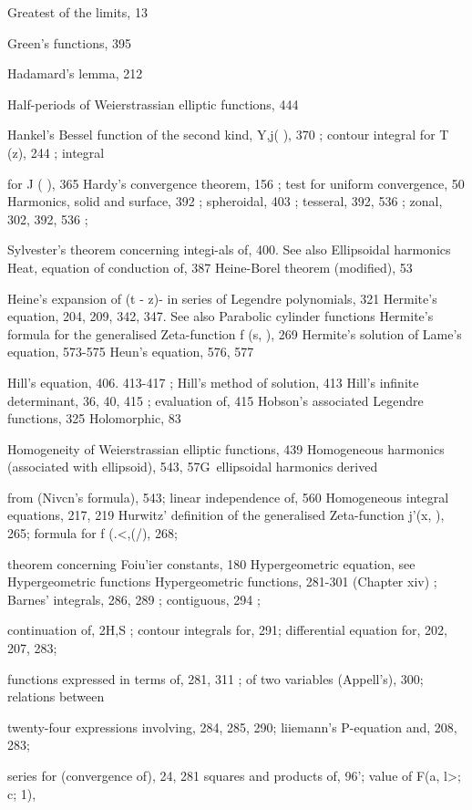 Greatest of the limits, 13

Green's functions, 395

Hadamard's lemma, 212

Half-periods of Weierstrassian elliptic functions, 444

Hankel's Bessel function of the second kind, Y,j( ), 370 ; contour integral for T (z), 244 ; integral

for J ( ), 365
Hardy's convergence theorem, 156 ; test for uniform convergence, 50
Harmonics, solid and surface, 392 ; spheroidal, 403 ; tesseral, 392, 536 ; zonal, 302, 392, 536 ;

Sylvester's theorem concerning integi-als of, 400. See also Ellipsoidal harmonics
Heat, equation of conduction of, 387
Heine-Borel theorem (modified), 53

Heine's expansion of (t - z)-  in series of Legendre polynomials, 321
Hermite's equation, 204, 209, 342, 347. See also Parabolic cylinder functions
Hermite's formula for the generalised Zeta-function f (s,  ), 269
Hermite's solution of Lame's equation, 573-575
Heun's equation, 576, 577

Hill's equation, 406. 413-417 ; Hill's method of solution, 413
Hill's infinite determinant, 36, 40, 415 ; evaluation of, 415
Hobson's associated Legendre functions, 325
Holomorphic, 83

Homogeneity of Weierstrassian elliptic functions, 439
Homogeneous harmonics (associated with ellipsoid), 543, 57G\ ellipsoidal harmonics derived

from (Nivcn's formula), 543; linear independence of, 560
Homogeneous integral equations, 217, 219
Hurwitz' definition of the generalised Zeta-function j'(x,  ), 265; formula for f (.<,(/), 268;

theorem concerning Foiu'ier constants, 180
Hypergeometric equation, see Hypergeometric functions
Hypergeometric functions, 281-301 (Chapter xiv) ; Barnes' integrals, 286, 289 ; contiguous, 294 ;

continuation of, 2H,S ; contour integrals for, 291; differential equation for, 202, 207, 283;

functions expressed in terms of, 281, 311 ; of two variables (Appell's), 300; relations between

twenty-four expressions involving, 284, 285, 290; liiemann's P-equation and, 208, 283;

series for (convergence of), 24, 281 squares and products of,  96'; value of F(a, l>; c; 1),


%
%

